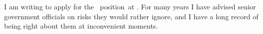 
I am writing to apply for the \theposition\ position\maybeteam\ at \theemployer\maybejobref. For many years I have advised senior government officials on risks they would rather ignore, and I have a long record of being right about them at inconvenient moments.\maybeappsentence
